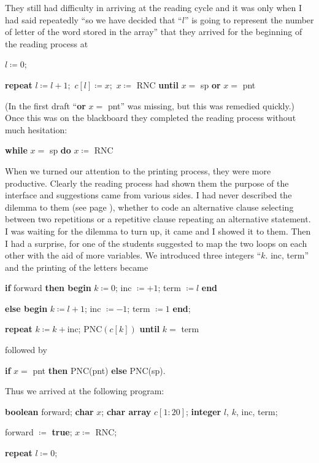 \documentclass[twoside,11pt]{book}
\begin{document}
They still had difficulty in arriving at the reading cycle and it was only when I had said repeatedly ``so we have decided that ``$l$'' is going to represent the number of letter of the word stored in the array'' that they arrived for the beginning of the reading process at

\quad $l \coloneq 0; $

\quad \textbf{repeat} $l \coloneq l + 1;$ $c[l] \coloneq x;$ $x\coloneq$ RNC \textbf{until} $x =$ sp \textbf{or} $x =$ pnt

\noindent
(In the first draft ``\textbf{or} $x =$ pnt'' was missing, but this was remedied quickly.) Once this was on the blackboard they completed the reading process without much hesitation:

\quad \textbf{while} $x =$ sp \textbf{do} $x\coloneq$ RNC

When we turned our attention to the printing process, they were more productive. Clearly the reading process had shown them the purpose of the interface and suggestions came from various sides. I had never described the dilemma to them (see page \pageref{pg:dilema}), whether to code an alternative clause selecting between two repetitions or a repetitive clause repeating an alternative statement. I was waiting for the dilemma to turn up, it came and I showed it to them. Then I had a surprise, for one of the students suggested to map the two loops on each other with the aid of more variables. We introduced three integers ``$k$. inc, term'' and the printing of the letters became

\quad \textbf{if} forward \textbf{then begin} $k \coloneq 0$; inc $\coloneq + 1$; term $\coloneq l$ \textbf{end}

\tabto{5.8em}\quad \textbf{else begin} $k \coloneq l + 1$; inc $\coloneq - 1$; term $\coloneq 1$ \textbf{end};

\quad \textbf{repeat} $k \coloneq k + \text{inc}$; $\text{PNC}(c[k])$ \textbf{until} $k =$ term

\noindent
followed by

\quad \textbf{if} $x =$ pnt \textbf{then} PNC(pnt) \textbf{else} PNC(sp).

Thus we arrived at the following program:

\quad \textbf{boolean} forward; \textbf{char} $x$; \textbf{char array} $c[1:20]$; \textbf{integer} $l$, $k$, inc, term;

\quad forward $\coloneq$ \textbf{true}; $x \coloneq$ RNC;

\quad \textbf{repeat} $l \coloneq 0$;
\end{document}
